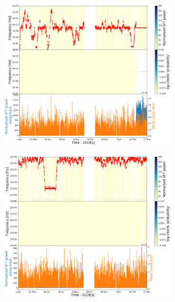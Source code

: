 %
\begin{figure}[ht]
	\centering
	\begin{subfigure}[h]{0.49\textwidth}
		\includegraphics[width=\textwidth]{C6_detchar/track_F63_95_64_05.png}
		\caption{\label{detchar:soap:newlines:1}}
	\end{subfigure}
	\begin{subfigure}[h]{0.49\textwidth}
		\includegraphics[width=\textwidth]{C6_detchar/track_F119_85_119_95.png}
		\caption{\label{detchar:soap:newlines:2}}
	\end{subfigure}
	

\end{figure}
